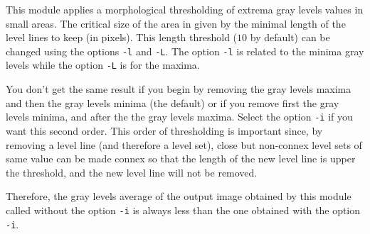 This module applies a morphological thresholding of extrema gray levels values
in small areas.
The critical size of the area in given by the minimal length of the level lines
to keep (in pixels).
This length threshold ($10$ by default) can be changed using the options
\verb+-l+ and \verb+-L+.
The option \verb+-l+ is related to the minima gray levels while the option
\verb+-L+ is for the maxima.

You don't get the same result if you begin by removing the gray levels maxima
and then the gray levels minima (the default) or if you remove first the
gray levels minima, and after the the gray levels maxima. 
Select the option \verb+-i+ if you want this second order.
This order of thresholding is important since, by removing a level
line (and therefore a level set), close but non-connex level sets of same 
value can be made connex so that the length of the new level line is upper
the threshold, and the new level line will not be removed.

Therefore, the gray levels average of the output image obtained by this
module called without the option \verb+-i+ is always less than the 
one obtained with the option \verb+-i+.
